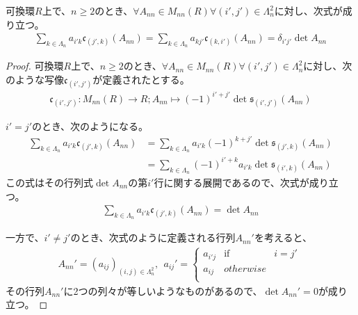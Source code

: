 \documentclass[dvipdfmx]{jsarticle}
\begin{document}
\begin{thm}\label{2.1.11.17}
可換環$R$上で、$n \geq 2$のとき、$\forall A_{nn} \in M_{nn}(R)\forall\left( i',j' \right) \in \varLambda_{n}^{2}$に対し、次式が成り立つ。
\begin{align*}
\sum_{k \in \varLambda_{n}} {a_{i'k}\mathfrak{c}_{\left( j',k \right)}\left( A_{nn} \right)} = \sum_{k \in \varLambda_{n}} {a_{kj'}\mathfrak{c}_{\left( k,i' \right)}\left( A_{nn} \right)} = \delta_{i'j'}\det A_{nn}
\end{align*}
\end{thm}
\begin{proof}
可換環$R$上で、$n \geq 2$のとき、$\forall A_{nn} \in M_{nn}(R)\forall\left( i',j' \right) \in \varLambda_{n}^{2}$に対し、次のような写像$\mathfrak{c}_{\left( i',j' \right)}$が定義されたとする。
\begin{align*}
\mathfrak{c}_{\left( i',j' \right)}:M_{nn}(R) \rightarrow R;A_{nn} \mapsto ( - 1)^{i' + j'}\det{\mathfrak{s}_{\left( i',j' \right)}\left( A_{nn} \right)}
\end{align*}\par
$i' = j'$のとき、次のようになる。
\begin{align*}
\sum_{k \in \varLambda_{n}} {a_{i'k}\mathfrak{c}_{\left( j',k \right)}\left( A_{nn} \right)} &= \sum_{k \in \varLambda_{n}} {a_{i'k}( - 1)^{k + j'}\det{\mathfrak{s}_{\left( j',k \right)}\left( A_{nn} \right)}}\\
&= \sum_{k \in \varLambda_{n}} {( - 1)^{i' + k}a_{i'k}\det{\mathfrak{s}_{\left( i',k \right)}\left( A_{nn} \right)}}
\end{align*}
この式はその行列式$\det A_{nn}$の第$i'$行に関する展開であるので、次式が成り立つ。
\begin{align*}
\sum_{k \in \varLambda_{n}} {a_{i'k}\mathfrak{c}_{\left( j',k \right)}\left( A_{nn} \right)} = \det A_{nn}
\end{align*}\par
一方で、$i' \neq j'$のとき、次式のように定義される行列$A_{nn}'$を考えると、
\begin{align*}
A_{nn}' = \left( a_{ij} \right)_{(i,j) \in \varLambda_{n}^{2}},\ \ a_{ij}' = \left\{ \begin{matrix}
a_{i'j} & \mathrm{if} & i = j' \\
a_{ij} & otherwise & \  \\
\end{matrix} \right.\ 
\end{align*}
その行列$A_{nn}'$に2つの列々が等しいようなものがあるので、$\det A_{nn}' = 0$が成り立つ。\par

\end{proof}
\end{document}
